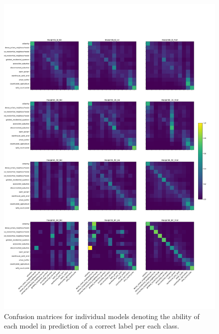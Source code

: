 \begin{figure}
    \centering
    \includegraphics[width=0.8\linewidth]{fig/maxprob_cm.png}
    \caption{\footnotesize Confusion matrices for individual models denoting
    the ability of each model in prediction of a correct label per each class.}
    \label{fig:maxprob_cm}
\end{figure}


